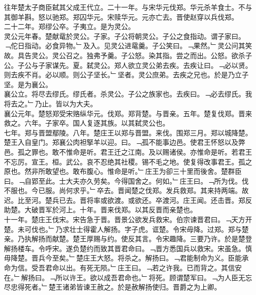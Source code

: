 \documentclass{zhvt-classic}
\begin{document}
\hspace*{2em}往年楚太子商臣弑其父成王代立。二十一年。与宋华元伐郑。华元杀羊食士。不与其御羊斟。怒以驰郑。郑囚华元。宋赎华元。元亦亡去。晋使赵穿以兵伐郑。\\
\hspace*{2em}二十二年。郑缪公卒。子夷立。是为灵公。\\
\hspace*{2em}灵公元年春。楚献鼋於灵公。子家。子公将朝灵公。子公之食指动。谓子家曰。﹁佗日指动。必食异物。﹂及入。见灵公进鼋羹。子公笑曰。﹁果然。﹂灵公问其笑故。具告灵公。灵公召之。独弗予羹。子公怒。染其指。尝之而出。公怒。欲杀子公。子公与子家谋先。夏。弑灵公。郑人欲立灵公弟去疾。去疾让曰。﹁必以贤。则去疾不肖。必以顺。则公子坚长。﹂坚者。灵公庶弟。去疾之兄也。於是乃立子坚。是为襄公。\\
\hspace*{2em}襄公立。将尽去缪氏。缪氏者。杀灵公。子公之族家也。去疾曰。﹁必去缪氏。我将去之。﹂乃止。皆以为大夫。\\
\hspace*{2em}襄公元年。楚怒郑受宋赂纵华元。伐郑。郑背楚。与晋亲。五年。楚复伐郑。晋来救之。六年。子家卒。国人复逐其族。以其弑灵公也。\\
\hspace*{2em}七年。郑与晋盟鄢陵。八年。楚庄王以郑与晋盟。来伐。围郑三月。郑以城降楚。楚王入自皇门。郑襄公肉袒掔羊以迎。曰。﹁孤不能事边邑。使君王怀怒以及弊邑。孤之罪也。敢不惟命是听。君王迁之江南。及以赐诸侯。亦惟命是听。若君王不忘厉。宣王。桓。武公。哀不忍绝其社稷。锡不毛之地。使复得改事君王。孤之原也。然非所敢望也。敢布腹心。惟命是听。﹂庄王为卻三十里而後舍。楚群臣曰。﹁自郢至此。士大夫亦久劳矣。今得国舍之。何如。﹂庄王曰。﹁所为伐。伐不服也。今已服。尚何求乎。﹂卒去。晋闻楚之伐郑。发兵救郑。其来持两端。故迟。比至河。楚兵已去。晋将率或欲渡。或欲还。卒渡河。庄王闻。还击晋。郑反助楚。大破晋军於河上。十年。晋来伐郑。以其反晋而亲楚也。\\
\hspace*{2em}十一年。楚庄王伐宋。宋告急于晋。晋景公欲发兵救宋。伯宗谏晋君曰。﹁天方开楚。未可伐也。﹂乃求壮士得霍人解扬。字子虎。诓楚。令宋毋降。过郑。郑与楚亲。乃执解扬而献楚。楚王厚赐与约。使反其言。令宋趣降。三要乃许。於是楚登解扬楼车。令呼宋。遂负楚约而致其晋君命曰。﹁晋方悉国兵以救宋。宋虽急。慎毋降楚。晋兵今至矣。﹂楚庄王大怒。将杀之。解扬曰。﹁君能制命为义。臣能承命为信。受吾君命以出。有死无陨。﹂庄王曰。﹁若之许我。已而背之。其信安在。﹂解扬曰。﹁所以许王。欲以成吾君命也。﹂将死。顾谓楚军曰。﹁为人臣无忘尽忠得死者。﹂楚王诸弟皆谏王赦之。於是赦解扬使归。晋爵之为上卿。\\
\end{document}
